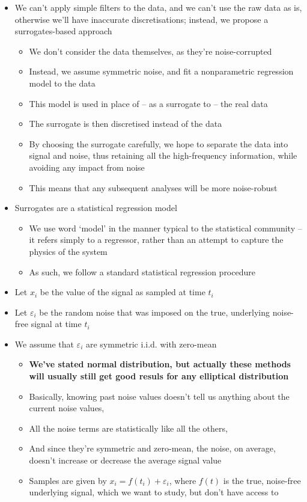 \documentclass[11pt]{article}
\begin{document}
\begin{itemize}
\item We can't apply simple filters to the data, and we can't use the raw data as is, otherwise we'll have inaccurate discretisations; instead, we propose a surrogates-based approach
\begin{itemize}
\item We don't consider the data themselves, as they're noise-corrupted
\item Instead, we assume symmetric noise, and fit a nonparametric regression model to the data
\item This model is used in place of -- as a surrogate to -- the real data
\item The surrogate is then discretised instead of the data
\item By choosing the surrogate carefully, we hope to separate the data into signal and noise, thus retaining all the high-frequency information, while avoiding any impact from noise
\item This means that any subsequent analyses will be more noise-robust
\end{itemize}

\item Surrogates are a statistical regression model
\begin{itemize}
\item We use word `model' in the manner typical to the statistical community -- it refers simply to a regressor, rather than an attempt to capture the physics of the system
\item As such, we follow a standard statistical regression procedure
\end{itemize}
\item Let \(x_i\) be the value of the signal as sampled at time \(t_i\)
\item Let \(\varepsilon_i\) be the random noise that was imposed on the true, underlying noise-free signal at time \(t_i\)
\item We assume that \(\varepsilon_i\) are symmetric i.i.d. with zero-mean
\begin{itemize}
\item \textbf{We've stated normal distribution, but actually these methods will usually still get good resuls for any elliptical distribution}
\item Basically, knowing past noise values doesn't tell us anything about the current noise values,
\item All the noise terms are statistically like all the others,
\item And since they're symmetric and zero-mean, the noise, on average, doesn't increase or decrease the average signal value
\item Samples are given by \(x_i = f(t_i) + \varepsilon_i\), where \(f(t)\) is the true, noise-free underlying signal, which we want to study, but don't have access to
\end{itemize}


\end{itemize}
\end{document}
